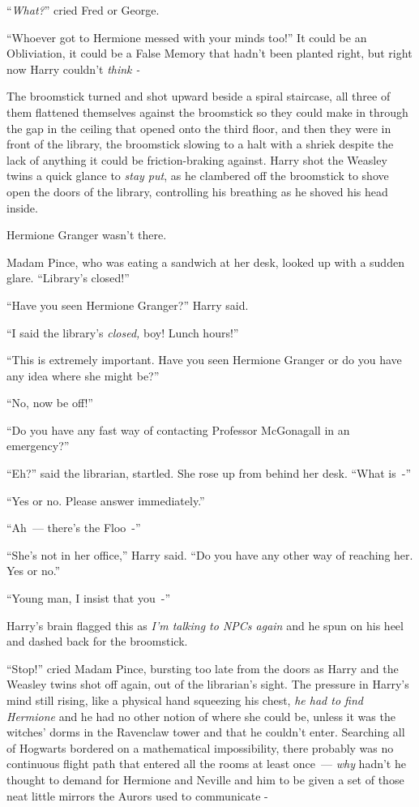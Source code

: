 ``\emph{What?}'' cried Fred or George.

``Whoever got to Hermione messed with your minds too!'' It could be an Obliviation, it could be a False Memory that hadn't been planted right, but right now Harry couldn't \emph{think -}

The broomstick turned and shot upward beside a spiral staircase, all three of them flattened themselves against the broomstick so they could make in through the gap in the ceiling that opened onto the third floor, and then they were in front of the library, the broomstick slowing to a halt with a shriek despite the lack of anything it could be friction-braking against. Harry shot the Weasley twins a quick glance to \emph{stay put}, as he clambered off the broomstick to shove open the doors of the library, controlling his breathing as he shoved his head inside.

Hermione Granger wasn't there.

Madam Pince, who was eating a sandwich at her desk, looked up with a sudden glare. ``Library's closed!''

``Have you seen Hermione Granger?'' Harry said.

``I said the library's \emph{closed,} boy! Lunch hours!''

``This is extremely important. Have you seen Hermione Granger or do you have any idea where she might be?''

``No, now be off!''

``Do you have any fast way of contacting Professor McGonagall in an emergency?''

``Eh?'' said the librarian, startled. She rose up from behind her desk. ``What is~-''

``Yes or no. Please answer immediately.''

``Ah~--- there's the Floo~-''

``She's not in her office,'' Harry said. ``Do you have any other way of reaching her. Yes or no.''

``Young man, I insist that you~-''

Harry's brain flagged this as \emph{I'm talking to NPCs again} and he spun on his heel and dashed back for the broomstick.

``Stop!'' cried Madam Pince, bursting too late from the doors as Harry and the Weasley twins shot off again, out of the librarian's sight. The pressure in Harry's mind still rising, like a physical hand squeezing his chest, \emph{he had to find Hermione} and he had no other notion of where she could be, unless it was the witches' dorms in the Ravenclaw tower and that he couldn't enter. Searching all of Hogwarts bordered on a mathematical impossibility, there probably was no continuous flight path that entered all the rooms at least once~--- \emph{why} hadn't he thought to demand for Hermione and Neville and him to be given a set of those neat little mirrors the Aurors used to communicate -

